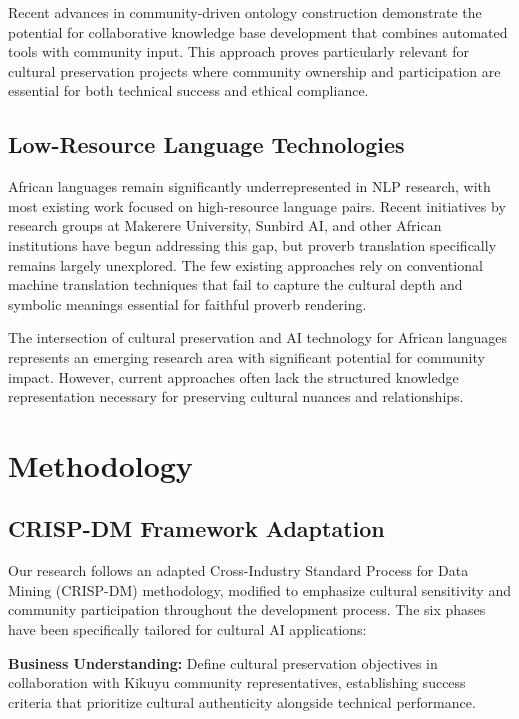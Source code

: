 \documentclass[
]{ceurart}
\begin{document}
Recent advances in community-driven ontology construction demonstrate the potential for collaborative knowledge base development that combines automated tools with community input. This approach proves particularly relevant for cultural preservation projects where community ownership and participation are essential for both technical success and ethical compliance.

\subsection{Low-Resource Language Technologies}

African languages remain significantly underrepresented in NLP research, with most existing work focused on high-resource language pairs. Recent initiatives by research groups at Makerere University, Sunbird AI, and other African institutions have begun addressing this gap, but proverb translation specifically remains largely unexplored. The few existing approaches rely on conventional machine translation techniques that fail to capture the cultural depth and symbolic meanings essential for faithful proverb rendering.

The intersection of cultural preservation and AI technology for African languages represents an emerging research area with significant potential for community impact. However, current approaches often lack the structured knowledge representation necessary for preserving cultural nuances and relationships.

\section{Methodology}

\subsection{CRISP-DM Framework Adaptation}

Our research follows an adapted Cross-Industry Standard Process for Data Mining (CRISP-DM) methodology, modified to emphasize cultural sensitivity and community participation throughout the development process. The six phases have been specifically tailored for cultural AI applications:

\textbf{Business Understanding:} Define cultural preservation objectives in collaboration with Kikuyu community representatives, establishing success criteria that prioritize cultural authenticity alongside technical performance.
\end{document}
